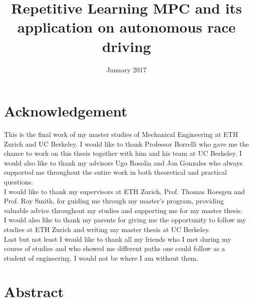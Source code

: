 \documentclass[10pt,twoside,a4paper,fleqn]{report}
\title{Repetitive Learning MPC and its application on autonomous race driving}
\date{January 2017}
\begin{document}
\maketitle 							%

\setcounter{tocdepth}{2}
\tableofcontents
 \cleardoublepage

\chapter*{Acknowledgement}
This is the final work of my master studies of Mechanical Engineering at ETH Zurich and UC Berkeley. I would like to thank Professor Borrelli who gave me the chance to work on this thesis together with him and his team at UC Berkeley. I would also like to thank my advisors Ugo Rosolia and Jon Gonzales who always supported me throughout the entire work in both theoretical and practical questions.\\
I would like to thank my supervisors at ETH Zurich, Prof. Thomas Roesgen and Prof. Roy Smith, for guiding me through my master's program, providing valuable advice throughout my studies and supporting me for my master thesis.\\
I would also like to thank my parents for giving me the opportunity to follow my studies at ETH Zurich and writing my master thesis at UC Berkeley.\\
Last but not least I would like to thank all my friends who I met during my course of studies and who showed me different paths one could follow as a student of engineering. I would not be where I am without them.
 \cleardoublepage
 
\chapter*{Abstract}
\end{document}
